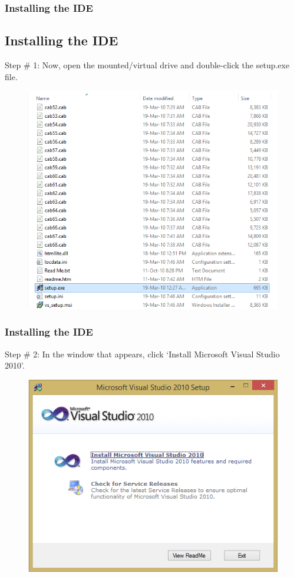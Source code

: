 \documentclass{beamer}
\begin{document}
\begin{frame}
    \frametitle{Installing the IDE}
    \subsection{Installing the IDE} %
    \label{sub:installing_the_ide}
    Step \# 1: Now, open the mounted/virtual drive and double-click the setup.exe file.
    \begin{figure}
        \centering
        \includegraphics[scale=0.42]{step_0_2}
    \end{figure}
\end{frame}

\begin{frame}
    \frametitle{Installing the IDE}
    Step \# 2: In the window that appears, click `Install Microsoft Visual Studio 2010'.
    \begin{figure}
        \centering
        \includegraphics[scale=0.55]{step_1}
    \end{figure}
\end{frame}
\end{document}
